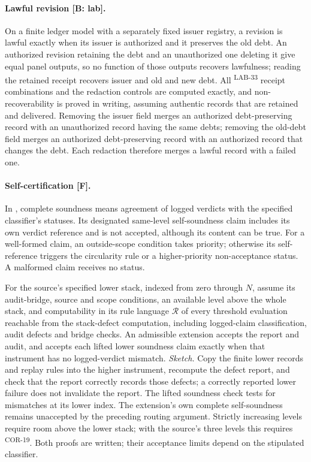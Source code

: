 \documentclass[pdflatex,sn-basic]{sn-jnl}%
\newcommand{\rec}[1]{\ifannotated\textsuperscript{\textcolor{blue!60!black}{\tiny#1}}\fi}
\begin{document}
\begin{appendices}
\paragraph{Lawful revision [B: lab].} On a finite ledger model with a separately fixed issuer registry, a revision is lawful exactly when its issuer is authorized and it preserves the old debt. An authorized revision retaining the debt and an unauthorized one deleting it give equal panel outputs, so no function of those outputs recovers lawfulness; reading the retained receipt recovers issuer and old and new debt. All \numCNineReceiptCombos\rec{LAB-33} receipt combinations and the redaction controls are computed exactly, and non-recoverability is proved in writing, assuming authentic records that are retained and delivered. Removing the issuer field merges an authorized debt-preserving record with an unauthorized record having the same debts; removing the old-debt field merges an authorized debt-preserving record with an authorized record that changes the debt. Each redaction therefore merges a lawful record with a failed one.

\paragraph{Self-certification [F].} In \citet{tsiokos2026f3}, complete soundness means agreement of logged verdicts with the specified classifier's statuses. Its designated same-level self-soundness claim includes its own verdict reference and is not accepted, although its content can be true. For a well-formed claim, an outside-scope condition takes priority; otherwise its self-reference triggers the circularity rule or a higher-priority non-acceptance status. A malformed claim receives no status.

For the source's specified lower stack, indexed from zero through $N$, assume its audit-bridge, source and scope conditions, an available level above the whole stack, and computability in its rule language $\mathcal R$ of every threshold evaluation reachable from the stack-defect computation, including logged-claim classification, audit defects and bridge checks. An admissible extension accepts the report and audit, and accepts each lifted lower soundness claim exactly when that instrument has no logged-verdict mismatch. \emph{Sketch.} Copy the finite lower records and replay rules into the higher instrument, recompute the defect report, and check that the report correctly records those defects; a correctly reported lower failure does not invalidate the report. The lifted soundness check tests for mismatches at its lower index. The extension's own complete self-soundness remains unaccepted by the preceding routing argument. Strictly increasing levels require room above the lower stack; with the source's three levels this requires \numFThreeStackBound\rec{COR-19}. Both proofs are written; their acceptance limits depend on the stipulated classifier.


\end{appendices}
\end{document}
